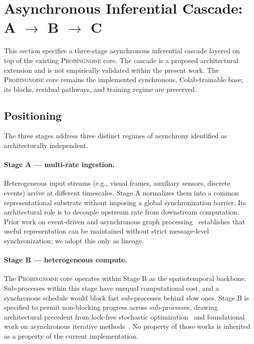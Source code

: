 \section{Asynchronous Inferential Cascade: A $\to$ B $\to$ C}
\label{sec:cascade-abc}

This section specifies a three-stage asynchronous inferential cascade layered
on top of the existing \textsc{Probingnoise} core. The cascade is a proposed
architectural extension and is not empirically validated within the present
work. The \textsc{Probingnoise} core remains the implemented synchronous,
Colab-trainable base; its blocks, residual pathways, and training regime are
preserved.

\subsection{Positioning}

The three stages address three distinct regimes of asynchrony identified as
architecturally independent.

\paragraph{Stage A --- multi-rate ingestion.} Heterogeneous input streams
(e.g., visual frames, auxiliary sensors, discrete events) arrive at different
timescales. Stage A normalizes them into a common representational substrate
without imposing a global synchronization barrier. Its architectural role is
to decouple upstream rate from downstream computation. Prior work on
event-driven and asynchronous graph processing~\citep{faber2022async,faber2024gwac}
establishes that useful representation can be maintained without strict
message-level synchronization; we adopt this only as lineage.

\paragraph{Stage B --- heterogeneous compute.} The \textsc{Probingnoise} core
operates within Stage B as the spatiotemporal backbone. Sub-processes within
this stage have unequal computational cost, and a synchronous schedule would
block fast sub-processes behind slow ones. Stage B is specified to permit
non-blocking progress across sub-processes, drawing architectural precedent
from lock-free stochastic optimization~\citep{niu2011hogwild} and foundational
work on asynchronous iterative methods~\citep{bertsekas1989parallel}. No
property of those works is inherited as a property of the current
implementation.

